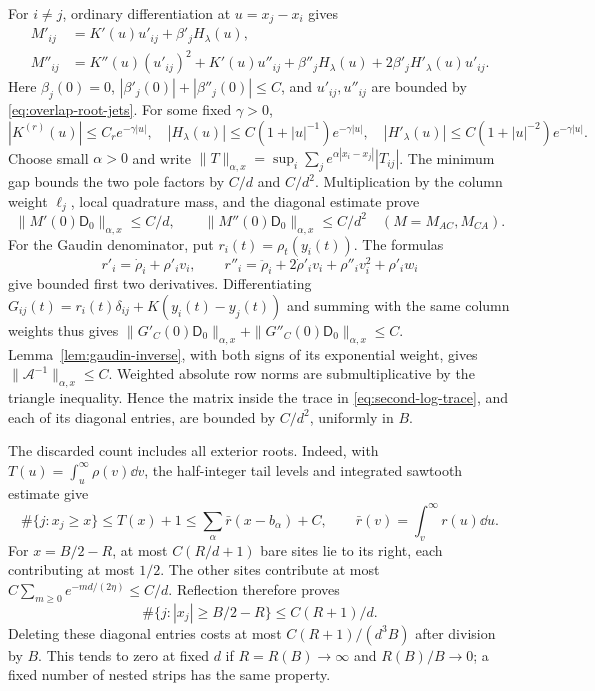 For \(i\ne j\), ordinary differentiation at \(u=x_j-x_i\) gives
\[
 \begin{split}
 M'_{ij}&=K'(u)u'_{ij}+\beta'_jH_\lambda(u),\\
 M''_{ij}&=K''(u)(u'_{ij})^2+K'(u)u''_{ij}
       +\beta''_jH_\lambda(u)+2\beta'_jH'_\lambda(u)u'_{ij}.
 \end{split}
\]
Here \(\beta_j(0)=0\), \(|\beta'_j(0)|+|\beta''_j(0)|\le C\),
and \(u'_{ij},u''_{ij}\) are bounded by \eqref{eq:overlap-root-jets}.
For some fixed \(\gamma>0\),
\[
 |K^{(r)}(u)|\le C_re^{-\gamma|u|},\quad
 |H_\lambda(u)|\le C(1+|u|^{-1})e^{-\gamma|u|},\quad
 |H'_\lambda(u)|\le C(1+|u|^{-2})e^{-\gamma|u|}.
\]
Choose small \(\alpha>0\) and write
\(\|T\|_{\alpha,x}=\sup_i\sum_j
 e^{\alpha|x_i-x_j|}|T_{ij}|\).
The minimum gap bounds the two pole factors by \(C/d\) and \(C/d^2\).
Multiplication by the column weight \(\ell_j\), local quadrature mass,
and the diagonal estimate prove
\begin{equation}\label{eq:overlap-taylor-row-bounds}
 \|M'(0)\mathsf D_0\|_{\alpha,x}\le C/d,\qquad
 \|M''(0)\mathsf D_0\|_{\alpha,x}\le C/d^2
 \quad(M=M_{AC},M_{CA}).
\end{equation}
For the Gaudin denominator, put \(r_i(t)=\rho_t(y_i(t))\).
The formulas
\[
 r'_i=\dot\rho_i+\rho'_iv_i,\qquad
 r''_i=\ddot\rho_i+2\dot\rho'_iv_i+\rho''_iv_i^2+\rho'_iw_i
\]
give bounded first two derivatives. Differentiating
\(G_{ij}(t)=r_i(t)\delta_{ij}+K(y_i(t)-y_j(t))\) and summing with
the same column weights thus gives
\(\|G'_C(0)\mathsf D_0\|_{\alpha,x}+\|G''_C(0)\mathsf D_0\|_{\alpha,x}\le C\).
Lemma~\ref{lem:gaudin-inverse}, with both signs of its exponential
weight, gives \(\|\mathcal A^{-1}\|_{\alpha,x}\le C\).
Weighted absolute row norms are submultiplicative by the triangle
inequality. Hence the matrix inside the trace in
\eqref{eq:second-log-trace}, and each of its diagonal entries,
are bounded by \(C/d^2\), uniformly in \(B\).

The discarded count includes all exterior roots. Indeed, with
\(T(u)=\int_u^\infty\rho(v)\dd v\), the half-integer tail levels
and integrated sawtooth estimate give
\[
 \#\{j:x_j\ge x\}\le T(x)+1
 \le\sum_\alpha\bar r(x-b_\alpha)+C,
 \qquad \bar r(v)=\int_v^\infty r(u)\dd u.
\]
For \(x=B/2-R\), at most \(C(R/d+1)\) bare sites lie to its right,
each contributing at most \(1/2\). The other sites contribute at most
\(C\sum_{m\ge0}e^{-md/(2\eta)}\le C/d\).
Reflection therefore proves
\begin{equation}\label{eq:overlap-end-count}
 \#\{j:|x_j|\ge B/2-R\}\le C(R+1)/d.
\end{equation}
Deleting these diagonal entries costs at most
\(C(R+1)/(d^3B)\) after division by \(B\).
This tends to zero at fixed \(d\) if \(R=R(B)\to\infty\) and
\(R(B)/B\to0\); a fixed number of nested strips has the same property.

